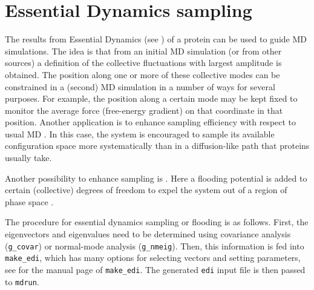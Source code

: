 
\section{Essential Dynamics sampling}
The results from Essential Dynamics (see )
of a protein can be used to guide MD simulations. The idea is that
from an initial MD simulation (or from other sources) a definition of
the collective fluctuations with largest amplitude is obtained. The
position along one or more of these collective modes can be
constrained in a (second) MD simulation in a number of ways for
several purposes. For example, the position along a certain mode may
be kept fixed to monitor the average force (free-energy gradient) on
that coordinate in that position. Another application is to enhance
sampling efficiency with respect to usual MD
\cite{Degroot96a,Degroot96b}. In this case, the system is encouraged
to sample its available configuration space more systematically than
in a diffusion-like path that proteins usually take.

Another possibility to enhance sampling is .
Here a flooding potential is added to certain
(collective) degrees of freedom to expel the system out
of a region of phase space \cite{Lange2006a}.

The procedure for essential dynamics sampling or flooding is as follows.
First, the eigenvectors and eigenvalues need to be determined
using covariance analysis ({\tt g_covar})
or normal-mode analysis ({\tt g_nmeig}).
Then, this information is fed into {\tt make_edi},
which has many options for selecting vectors and setting parameters,
see  for the manual page of {\tt make_edi}.
The generated {\tt edi} input file is then passed to {\tt mdrun}.


\section{}

